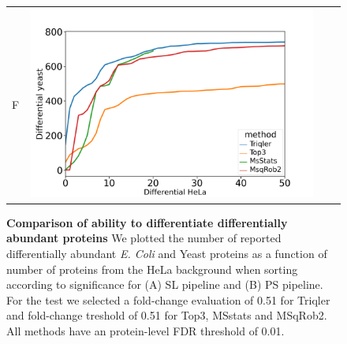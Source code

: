 \documentclass[11pt]{article}
\begin{document}
\begin{figure}[hbt]
\begin{tabular}{lclc}
        F & \includegraphics[width=0.45\linewidth]{../../result/report_plots_pipeline/diff_HeLa_vs_nonHeLa_PS_yeast_0.51.png} \\ 

    \end{tabular}
    \caption{{\bf Comparison of ability to differentiate differentially abundant proteins} We plotted the number of reported differentially abundant  {\em E. Coli} and Yeast proteins as a function of number of proteins from the HeLa background when sorting according to significance for (A) SL pipeline and (B) PS pipeline. For the test we selected a fold-change evaluation of 0.51 for Triqler and fold-change treshold of 0.51 for Top3, MSstats and MSqRob2. All methods have an protein-level FDR threshold of 0.01. \label{fig:ability_to_differentiate_differentially_abundant_specie_vs_hela}}
\end{figure}

\iffalse
\end{document}
